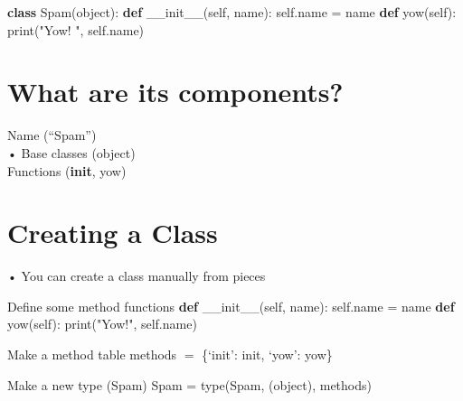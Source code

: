 \documentclass[
  letterpaper,
  DIV=11,
  numbers=noendperiod]{scrreprt}
\newenvironment{Shaded}{\begin{snugshade}}{\end{snugshade}}
\newcommand{\BuiltInTok}[1]{\textcolor[rgb]{0.00,0.23,0.31}{#1}}
\newcommand{\FunctionTok}[1]{\textcolor[rgb]{0.28,0.35,0.67}{#1}}
\newcommand{\KeywordTok}[1]{\textcolor[rgb]{0.00,0.23,0.31}{\textbf{#1}}}
\newcommand{\NormalTok}[1]{\textcolor[rgb]{0.00,0.23,0.31}{#1}}
\newcommand{\OperatorTok}[1]{\textcolor[rgb]{0.37,0.37,0.37}{#1}}
\newcommand{\StringTok}[1]{\textcolor[rgb]{0.13,0.47,0.30}{#1}}
\newcommand{\VariableTok}[1]{\textcolor[rgb]{0.07,0.07,0.07}{#1}}
\begin{document}
\begin{Shaded}
\begin{Highlighting}[]
\KeywordTok{class}\NormalTok{ Spam(}\BuiltInTok{object}\NormalTok{): }\KeywordTok{def} \FunctionTok{\_\_init\_\_}\NormalTok{(}\VariableTok{self}\NormalTok{, name): }\VariableTok{self}\NormalTok{.name }\OperatorTok{=}\NormalTok{ name }\KeywordTok{def}\NormalTok{ yow(}\VariableTok{self}\NormalTok{): }\BuiltInTok{print}\NormalTok{(}\StringTok{"Yow! "}\NormalTok{, }\VariableTok{self}\NormalTok{.name) }
\end{Highlighting}
\end{Shaded}


\chapter{What are its components?}\label{what-are-its-components}

Name (``Spam'')\\
• Base classes (object)\\
Functions (\textbf{init}, yow)


\chapter{Creating a Class}\label{creating-a-class}

• You can create a class manually from pieces

\begin{Shaded}
\begin{Highlighting}[]
\NormalTok{Define some method functions }\KeywordTok{def} \FunctionTok{\_\_init\_\_}\NormalTok{(}\VariableTok{self}\NormalTok{, name): }\VariableTok{self}\NormalTok{.name }\OperatorTok{=}\NormalTok{ name }\KeywordTok{def}\NormalTok{ yow(}\VariableTok{self}\NormalTok{): }\BuiltInTok{print}\NormalTok{(}\StringTok{"Yow!"}\NormalTok{, }\VariableTok{self}\NormalTok{.name) }
\end{Highlighting}
\end{Shaded}

Make a method table methods \(=\) \{`init': init, `yow': yow\}

\begin{Shaded}
\begin{Highlighting}[]
\NormalTok{Make a new type (Spam)  }
\NormalTok{Spam = type(\textquotesingle{}Spam\textquotesingle{}, (object), methods) }
\end{Highlighting}
\end{Shaded}
\end{document}
